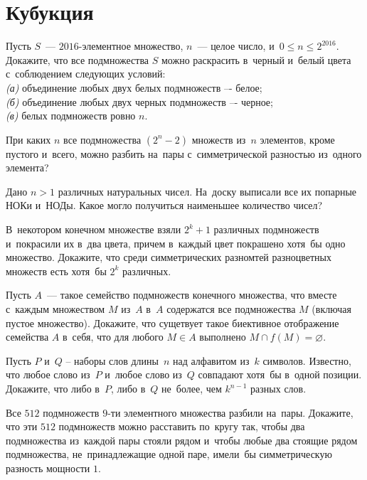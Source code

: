 
\section*{Кубукция}


\begin{problems}

\item
Пусть $S$~--- $2016$-элементное множество, $n$~--- целое число,
и~$0 \leq n \leq 2^{2016}$.
Докажите, что все подмножества $S$ можно раскрасить в~черный и~белый цвета
с~соблюдением следующих условий:
\\
\textit{(а)} объединение любых двух белых подмножеств –- белое;
\\
\textit{(б)} объединение любых двух черных подмножеств –- черное;
\\
\textit{(в)} белых подмножеств ровно $n$.

\item
При каких $n$ все подмножества $(2^n - 2)$ множеств из~$n$ элементов, кроме
пустого и~всего, можно разбить на~пары с~симметрической разностью из~одного
элемента?

\item
Дано $n > 1$ различных натуральных чисел.
На~доску выписали все их попарные НОКи и~НОДы.
Какое могло получиться наименьшее количество чисел?

\item
В~некотором конечном множестве взяли $2^k + 1$ различных подмножеств
и~покрасили их в~два цвета, причем в~каждый цвет покрашено хотя~бы одно
множество.
Докажите, что среди симметрических разномтей разноцветных множеств есть хотя~бы
$2^k$ различных.

\item
Пусть $A$~--- такое семейство подмножеств конечного множества, что вместе
с~каждым множеством $M$ из~$A$ в~$A$ содержатся все подмножества $M$
(включая пустое множество).
Докажите, что сущетвует такое биективное отображение семейства $A$ в~себя, что
для любого $M \in A$ выполнено $M \cap f(M) = \varnothing$.

\item
Пусть $P$ и~$Q$ -- наборы слов длины~$n$ над алфавитом из~$k$ символов.
Известно, что любое слово из~$P$ и~любое слово из~$Q$ совпадают хотя~бы в~одной
позиции.
Докажите, что либо в~$P$, либо в~$Q$ не~более, чем $k^{n-1}$ разных слов.

\item
Все $512$ подмножеств $9$-ти элементного множества разбили на~пары.
Докажите, что эти $512$ подмножеств можно расставить по~кругу так, чтобы два
подмножества из~каждой пары стояли рядом и~чтобы любые два стоящие рядом
подмножества, не~принадлежащие одной паре, имели~бы симметрическую разность
мощности $1$.

\end{problems}

